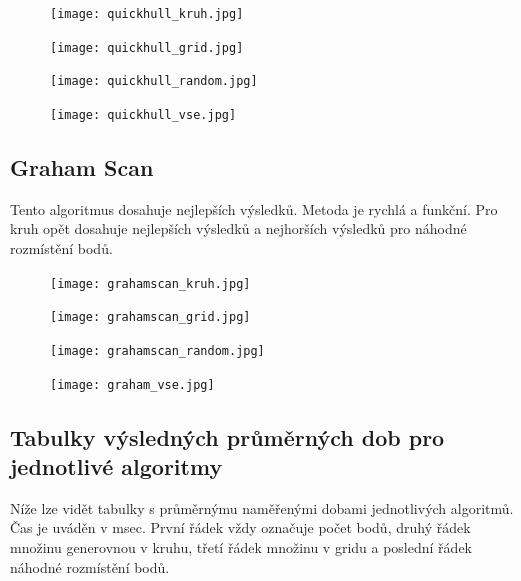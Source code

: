 \documentclass[a4paper, 12pt]{article}
\begin{document}
\begin{figure}[h!]
	\centering
	\texttt{[image: quickhull\_kruh.jpg]}
\end{figure}


\begin{figure}[h!]
	\centering
	\texttt{[image: quickhull\_grid.jpg]}
\end{figure}


\begin{figure}[h!]
	\centering
	\texttt{[image: quickhull\_random.jpg]}
\end{figure}


\begin{figure}[h!]
	\centering
	\texttt{[image: quickhull\_vse.jpg]}
\end{figure}


\subsection{Graham Scan}
Tento algoritmus dosahuje nejlepších výsledků. Metoda je rychlá a funkční. Pro kruh opět dosahuje nejlepších výsledků a nejhorších výsledků pro náhodné rozmístění bodů.

\begin{figure}[h!]
	\centering
	\texttt{[image: grahamscan\_kruh.jpg]}
\end{figure}


\begin{figure}[h!]
	\centering
	\texttt{[image: grahamscan\_grid.jpg]}
\end{figure}


\begin{figure}[h!]
	\centering
	\texttt{[image: grahamscan\_random.jpg]}
\end{figure}


\begin{figure}[h!]
	\centering
	\texttt{[image: graham\_vse.jpg]}
\end{figure}



\clearpage
\subsection{Tabulky výsledných průměrných dob pro jednotlivé algoritmy}

Níže lze vidět tabulky s průměrnýmu naměřenými dobami jednotlivých algoritmů. Čas je uváděn v msec. První řádek vždy označuje počet bodů, druhý řádek množinu generovnou v kruhu, třetí řádek množinu v gridu a poslední řádek náhodné rozmístění bodů.
\end{document}
